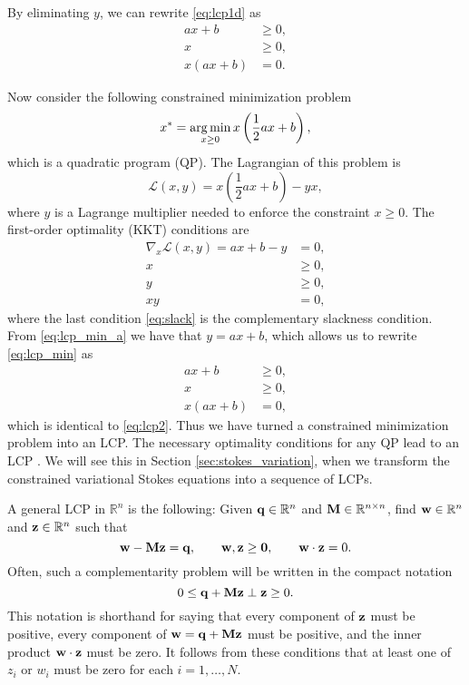 By eliminating $y$, we can rewrite \eqref{eq:lcp1d} as
\begin{subequations}\label{eq:lcp2}
\begin{align}
	 ax + b&\geq 0, \label{eq:constraint-a}\\
	 x&\geq 0,\label{eq:constraint-b}\\
	 x(ax+b) &= 0.\label{eq:comp-condition}
\end{align}
\end{subequations}

Now consider the following constrained minimization problem 
\[ x^* = \operatorname*{arg\,min}\limits_{x\geq 0} x\left(\frac{1}{2}ax + b\right),\]
which is a quadratic program (QP). The Lagrangian of  this problem is 
\[ \mathcal{L}(x,y) =  x\left(\frac{1}{2}ax + b\right) - yx,\]
where $y$ is a Lagrange multiplier needed to enforce the constraint $x\geq 0$. The first-order optimality (KKT) conditions \cite{Sundaram1996} are
\begin{subequations}\label{eq:lcp_min}
\begin{align}
	\nabla_x \mathcal{L}(x,y) = ax + b - y &= 0,\label{eq:lcp_min_a}\\
	x &\geq 0,\\
	y &\geq 0,\\
	xy &= 0,\label{eq:slack}
\end{align}
\end{subequations}
where the last condition \eqref{eq:slack} is  the complementary slackness condition. From \eqref{eq:lcp_min_a} we have that $y = ax + b$, which allows us to rewrite \eqref{eq:lcp_min} as
\begin{align*}
	ax + b &\geq 0,\\
	x &\geq 0,\\
	x(ax + b) &= 0,
\end{align*}
which is identical to \eqref{eq:lcp2}. Thus we have turned a constrained minimization problem into an LCP. The necessary optimality conditions for any QP lead to an LCP \cite{Murty1988}. We will see this in Section \ref{sec:stokes_variation}, when we transform the constrained variational Stokes equations into a sequence of LCPs. 

A general LCP in $\mathbb{R}^n$ is the following: Given ${\mathbf{q}}\in\mathbb{R}^n$ and ${\mathbf{M}}\in\mathbb{R}^{n\times n}$, find ${\mathbf{w}}\in\mathbb{R}^n$ and ${\mathbf{z}}\in\mathbb{R}^n$ such that
\begin{equation}\label{eq:lcp} {\mathbf{w}} - {\mathbf{M}}{\mathbf{z}} = {\mathbf{q}},\qquad {\mathbf{w}},{\mathbf{z}}\geq \mathbf{0}, \qquad {\mathbf{w}}\cdot{\mathbf{z}} = 0.\end{equation}
Often, such a complementarity problem will be written in the compact notation 
\[ 0 \leq {\mathbf{q}} + {\mathbf{M}}{\mathbf{z}}\perp {\mathbf{z}} \geq 0.\] 
This notation is shorthand for saying that every component of ${\mathbf{z}}$ must be positive, every component of ${\mathbf{w}} = {\mathbf{q}} + {\mathbf{M}}{\mathbf{z}}$ must be positive, and the inner product ${\mathbf{w}}\cdot{\mathbf{z}}$ must be zero. It follows from these conditions that at least one of $z_i$ or $w_i$ must be zero for each $i=1,\hdots, N$.

